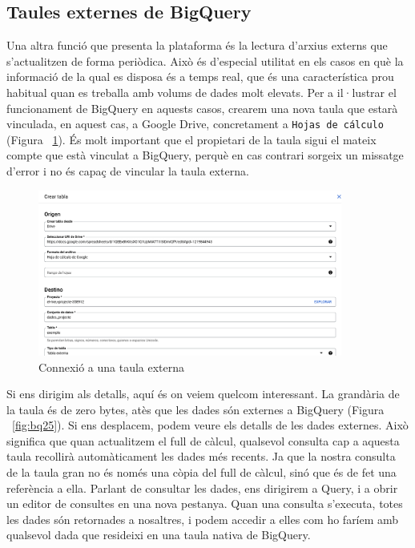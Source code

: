 \documentclass[11pt,longbibliography]{article}
\theoremstyle{definition}
\theoremstyle{remark}
\begin{document}
\subsection{Taules externes de BigQuery}

Una altra funció que presenta la plataforma és la lectura d'arxius externs que s'actualitzen de forma periòdica. Això és d'especial utilitat en els casos en què la informació de la qual es disposa és a temps real, que és una característica prou habitual quan es treballa amb volums de dades molt elevats. Per a il·lustrar el funcionament de BigQuery en aquests casos, crearem una nova taula que estarà vinculada, en aquest cas, a Google Drive, concretament a \verb|Hojas de cálculo| (Figura ~\ref{fig:bq24}). És molt important que el propietari de la taula sigui el mateix compte que està vinculat a BigQuery, perquè en cas contrari sorgeix un missatge d'error i no és capaç de vincular la taula externa.


\begin{figure}[h!]
\begin{center}
\includegraphics[width=10cm]{bq24}
\end{center}
\caption{Connexió a una taula externa}
\label{fig:bq24}
\end{figure}



Si ens dirigim als detalls, aquí és on veiem quelcom interessant. La grandària de la taula és de zero bytes, atès que les dades són externes a BigQuery (Figura ~\ref{fig:bq25}). Si ens desplacem, podem veure els detalls de les dades externes. Això significa que quan actualitzem el full de càlcul, qualsevol consulta cap a aquesta taula recollirà automàticament les dades més recents. Ja que la nostra consulta de la taula gran no és només una còpia del full de càlcul, sinó que és de fet una referència a ella. Parlant de consultar les dades, ens dirigirem a Query, i a obrir un editor de consultes en una nova pestanya. Quan una consulta s'executa, totes les dades són retornades a nosaltres, i podem accedir a elles com ho faríem amb qualsevol dada que resideixi en una taula nativa de BigQuery. 
\end{document}
